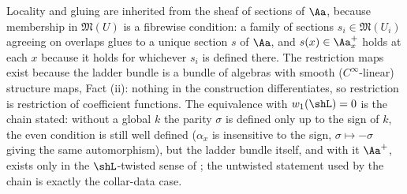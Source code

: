 Locality and gluing are inherited from the sheaf of sections of $\Aa$, because membership in $\mathfrak{M}(U)$ is a fibrewise condition: a family of sections $s_i \in \mathfrak{M}(U_i)$ agreeing on overlaps glues to a unique section $s$ of $\Aa$, and $s(x) \in \Aa_x^{+}$ holds at each $x$ because it holds for whichever $s_i$ is defined there. The restriction maps exist because the ladder bundle is a bundle of algebras with smooth ($C^\infty$-linear) structure maps, Fact (ii): nothing in the construction differentiates, so restriction is restriction of coefficient functions. The equivalence with $w_1(\shL) = 0$ is the chain stated: without a global $k$ the parity $\sigma$ is defined only up to the sign of $k$, the even condition is still well defined ($\alpha_x$ is insensitive to the sign, $\sigma \mapsto -\sigma$ giving the same automorphism), but the ladder bundle itself, and with it $\Aa^{+}$, exists only in the $\shL$-twisted sense of \cite[\S 4]{ButlerT4}; the untwisted statement used by the chain is exactly the collar-data case.

